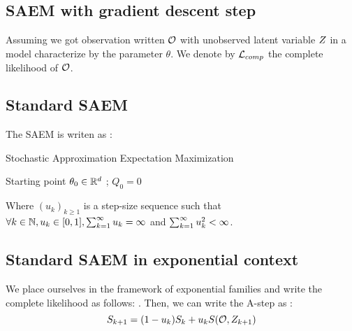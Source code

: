 \documentclass[a4paper]{article}
\begin{document}
 
\begin{myText}

\section{SAEM with gradient descent step}

Assuming we got observation written $\mathcal O$ with unobserved latent variable $Z$ in a model characterize by the parameter $\theta$. We denote by $\mathcal L_{comp}$ the complete likelihood of $\mathcal O$.

\subsection{Standard SAEM}

The SAEM is writen as : 

\begin{myAlgorithm}[13cm]
    \caption{Stochastic Approximation Expectation Maximization}
    \Initialize Starting point $\theta_0 \in \mathbb R^d$ ; $Q_0 = 0$
    
\end{myAlgorithm}

Where $(u_k)_{k\geq 1}$ is a step-size sequence such that $\forall k \in \mathbb N, u_k \in [0,1], \sum_{k=1} ^{\infty} u_k= \infty$ and $\sum_{k=1} ^{\infty} u_k^2< \infty$.

\subsection{Standard SAEM in exponential context}

We place ourselves in the framework of exponential families and write the complete likelihood as follows: . Then, we can write the A-step as : 
$$S_{k+1} = (1-u_k) S_k + u_k S(\mathcal O, Z_{k+1})$$


\end{myText}
\end{document}
